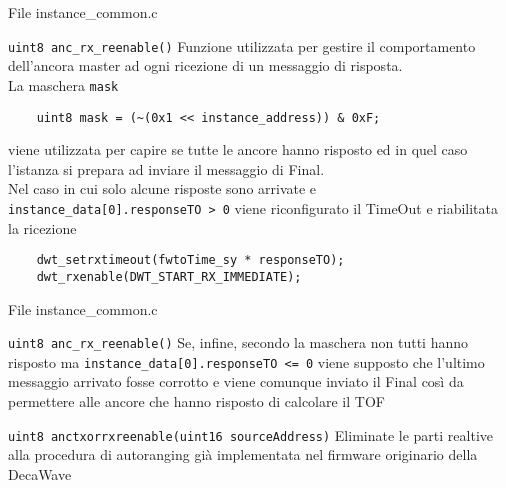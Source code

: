 \begin{frame}[fragile, shirnk=30]{File instance\_common.c}
  \begin{block}{\lstinline!uint8 anc_rx_reenable()!}
    Funzione utilizzata per gestire il comportamento dell'ancora master ad ogni ricezione di un messaggio di risposta.\\
    La maschera \lstinline!mask!
    \begin{lstlisting}
    uint8 mask = (~(0x1 << instance_address)) & 0xF;
    \end{lstlisting}
    viene utilizzata per capire se tutte le ancore hanno risposto ed in quel caso l'istanza si prepara ad inviare il messaggio di Final.\\
    Nel caso in cui solo alcune risposte sono arrivate e \lstinline!instance_data[0].responseTO > 0! viene riconfigurato il TimeOut e riabilitata
    la ricezione 
    \begin{lstlisting}
    dwt_setrxtimeout(fwtoTime_sy * responseTO); 
    dwt_rxenable(DWT_START_RX_IMMEDIATE);
    \end{lstlisting}
  \end{block}
\end{frame}

\begin{frame}{File instance\_common.c}
  \begin{block}{\lstinline!uint8 anc_rx_reenable()!}
    Se, infine, secondo la maschera non tutti hanno risposto ma \lstinline!instance_data[0].responseTO <= 0! viene supposto che l'ultimo messaggio
    arrivato fosse corrotto e viene comunque inviato il Final così da permettere alle ancore che hanno risposto di calcolare il TOF
  \end{block}
  \begin{block}{\lstinline!uint8 anctxorrxreenable(uint16 sourceAddress)!}
    Eliminate le parti realtive alla procedura di autoranging già implementata nel firmware originario della DecaWave
  \end{block}
\end{frame}

